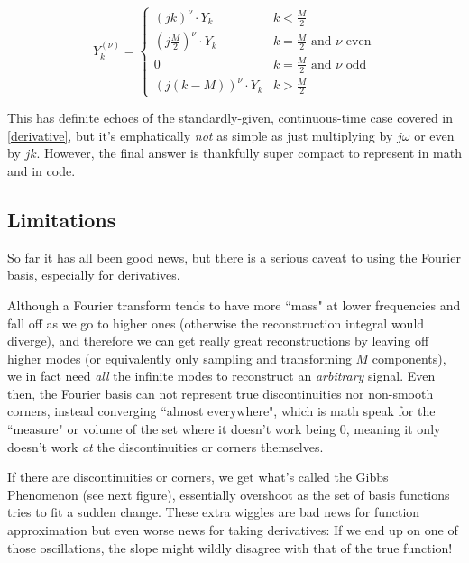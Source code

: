 \documentclass[10pt]{article}
\begin{document}
\begin{equation}\label{Y_nu}
Y^{(\nu)}_k = \begin{cases} (j k)^\nu \cdot Y_k & k < \frac{M}{2} \\ (j \frac{M}{2})^\nu \cdot Y_k & k = \frac{M}{2} \text{ and } \nu \text{ even} \\ 0 & k = \frac{M}{2} \text{ and } \nu \text{ odd} \\ (j(k - M))^\nu \cdot Y_k & k > \frac{M}{2} \end{cases}
\end{equation}

This has definite echoes of the standardly-given, continuous-time case covered in \autoref{derivative}, but it's emphatically \textit{not} as simple as just multiplying by $j\omega$ or even by $j k$. However, the final answer is thankfully super compact to represent in math and in code.

\subsection{Limitations}\label{artefacts}

So far it has all been good news, but there is a serious caveat to using the Fourier basis, especially for derivatives.

Although a Fourier transform tends to have more ``mass" at lower frequencies and fall off as we go to higher ones (otherwise the reconstruction integral would diverge), and therefore we can get really great reconstructions by leaving off higher modes\cite{kutz} (or equivalently only sampling and transforming $M$ components), we in fact need \textit{all} the infinite modes to reconstruct an \textit{arbitrary} signal\cite{oppenheim}. Even then, the Fourier basis can not represent true discontinuities nor non-smooth corners, instead converging ``almost everywhere", which is math speak for the ``measure" or volume of the set where it doesn't work being 0, meaning it only doesn't work \textit{at} the discontinuities or corners themselves.\cite{oppenheim}

If there are discontinuities or corners, we get what's called the Gibbs Phenomenon\cite{oppenheim} (see next figure), essentially overshoot as the set of basis functions tries to fit a sudden change. These extra wiggles are bad news for function approximation but even worse news for taking derivatives: If we end up on one of those oscillations, the slope might wildly disagree with that of the true function!
\end{document}
